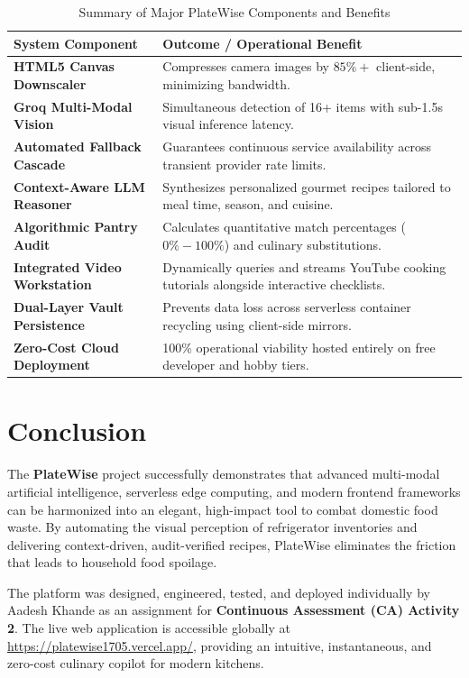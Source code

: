 \begin{table}[H]
\centering
\caption{Summary of Major PlateWise Components and Benefits}
\label{tab:summary_benefits}
\begin{tabular}{|p{4.2cm}|p{8.8cm}|}
\hline
\textbf{System Component} & \textbf{Outcome / Operational Benefit} \\ \hline
\textbf{HTML5 Canvas Downscaler} & Compresses camera images by $85\%+$ client-side, minimizing bandwidth. \\ \hline
\textbf{Groq Multi-Modal Vision} & Simultaneous detection of 16+ items with sub-1.5s visual inference latency. \\ \hline
\textbf{Automated Fallback Cascade} & Guarantees continuous service availability across transient provider rate limits. \\ \hline
\textbf{Context-Aware LLM Reasoner} & Synthesizes personalized gourmet recipes tailored to meal time, season, and cuisine. \\ \hline
\textbf{Algorithmic Pantry Audit} & Calculates quantitative match percentages ($0\% - 100\%$) and culinary substitutions. \\ \hline
\textbf{Integrated Video Workstation} & Dynamically queries and streams YouTube cooking tutorials alongside interactive checklists. \\ \hline
\textbf{Dual-Layer Vault Persistence} & Prevents data loss across serverless container recycling using client-side mirrors. \\ \hline
\textbf{Zero-Cost Cloud Deployment} & 100\% operational viability hosted entirely on free developer and hobby tiers. \\ \hline
\end{tabular}
\end{table}

\section{Conclusion}
The \textbf{PlateWise} project successfully demonstrates that advanced multi-modal artificial intelligence, serverless edge computing, and modern frontend frameworks can be harmonized into an elegant, high-impact tool to combat domestic food waste. By automating the visual perception of refrigerator inventories and delivering context-driven, audit-verified recipes, PlateWise eliminates the friction that leads to household food spoilage.

The platform was designed, engineered, tested, and deployed individually by Aadesh Khande as an assignment for \textbf{Continuous Assessment (CA) Activity 2}. The live web application is accessible globally at \url{https://platewise1705.vercel.app/}, providing an intuitive, instantaneous, and zero-cost culinary copilot for modern kitchens.

